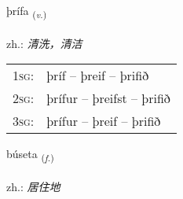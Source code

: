 \documentclass[frontgrid, backgrid]{flacards}\usepackage[]{graphicx}\usepackage[]{xcolor}
\begin{document}
\renewcommand{\flhead}{\vskip5pt \fboxsep=0pt {\small\bfseries\footnotesize Sagnorð | 动词}}
\renewcommand{\fcfoot}{\vskip5pt \fboxsep=0pt \hspace{2pt}{\small\bfseries\footnotesize 3K}}

\renewcommand{\blhead}{\vskip5pt {\small\bfseries\footnotesize Sagnorð | 动词 }}
\renewcommand{\bcfoot}{\vskip5pt \hspace{2pt}{\small\bfseries\footnotesize 3K}}


{þrífa \small{\textsubscript{(\textit{v.})}} \\[1ex] %
\textphonetic{[θriːva]} \\
zh.: \emph{清洗，清洁} \\  [2ex]
\renewcommand*{\arraystretch}{0.8}
\begin{tabular}{p{1cm}l}
\textsc{1sg}: & þríf -- þreif -- þrifið \\ 
\textsc{2sg}: & þrífur -- þreifst -- þrifið \\ 
\textsc{3sg}: & þrífur -- þreif -- þrifið \\ 
\end{tabular}
}

\renewcommand{\flhead}{\vskip5pt \fboxsep=0pt {\small\bfseries\footnotesize Nafnorð | 名词}}
\renewcommand{\fcfoot}{\vskip5pt \fboxsep=0pt \hspace{2pt}{\small\bfseries\footnotesize 3K}}

\renewcommand{\blhead}{\vskip5pt {\small\bfseries\footnotesize Nafnorð | 名词 }}
\renewcommand{\bcfoot}{\vskip5pt \hspace{2pt}{\small\bfseries\footnotesize 3K}}


{búseta \small{\textsubscript{(\textit{f.})}} \\[1ex] %
\textphonetic{[puːsɛta]} \\
zh.: \emph{居住地} \\  [2ex]
\renewcommand*{\arraystretch}{0.8}
}
\end{document}
